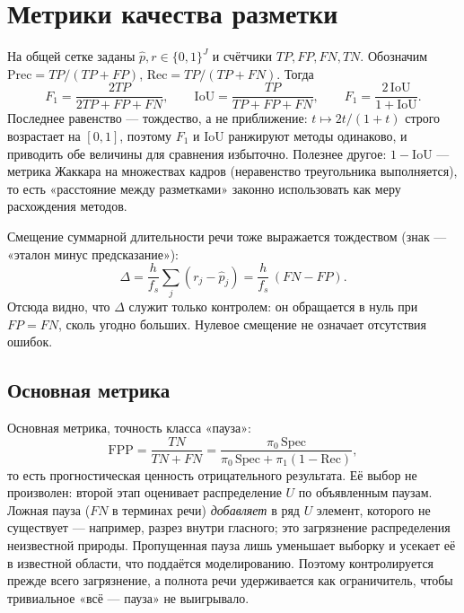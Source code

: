 \documentclass[11pt,a4paper]{article}
\theoremstyle{definition}
\theoremstyle{plain}
\begin{document}
\section{Метрики качества разметки}

На общей сетке заданы $\hat p,r\in\{0,1\}^J$ и счётчики $TP,FP,FN,TN$.
Обозначим $\mathrm{Prec}=TP/(TP+FP)$, $\mathrm{Rec}=TP/(TP+FN)$. Тогда
\begin{equation}\label{eq:metrics}
F_1=\frac{2TP}{2TP+FP+FN},\qquad
\mathrm{IoU}=\frac{TP}{TP+FP+FN},\qquad
F_1=\frac{2\,\mathrm{IoU}}{1+\mathrm{IoU}} .
\end{equation}
Последнее равенство --- тождество, а не приближение: $t\mapsto 2t/(1+t)$
строго возрастает на $[0,1]$, поэтому $F_1$ и $\mathrm{IoU}$ ранжируют методы
одинаково, и приводить обе величины для сравнения избыточно. Полезнее другое:
$1-\mathrm{IoU}$ --- метрика Жаккара на множествах кадров (неравенство
треугольника выполняется), то есть «расстояние между разметками» законно
использовать как меру расхождения методов.

Смещение суммарной длительности речи тоже выражается тождеством
(знак --- «эталон минус предсказание»):
\begin{equation}\label{eq:bias}
\Delta=\frac{h}{f_s}\sum_{j}(r_j-\hat p_j)=\frac{h}{f_s}\,(FN-FP).
\end{equation}
Отсюда видно, что $\Delta$ служит только контролем: он обращается в нуль при
$FP=FN$, сколь угодно больших. Нулевое смещение не означает отсутствия ошибок.

\subsection{Основная метрика}

Основная метрика, точность класса «пауза»:
\begin{equation}\label{eq:fpp}
\mathrm{FPP}=\frac{TN}{TN+FN}
=\frac{\pi_0\,\mathrm{Spec}}{\pi_0\,\mathrm{Spec}+\pi_1(1-\mathrm{Rec})},
\end{equation}
то есть прогностическая ценность отрицательного результата. Её выбор не
произволен: второй этап оценивает распределение $U$ по объявленным паузам.
Ложная пауза ($FN$ в терминах речи) \emph{добавляет} в ряд $U$ элемент,
которого не существует --- например, разрез внутри гласного; это загрязнение
распределения неизвестной природы. Пропущенная пауза лишь уменьшает выборку и
усекает её в известной области, что поддаётся моделированию. Поэтому
контролируется прежде всего загрязнение, а полнота речи удерживается как
ограничитель, чтобы тривиальное «всё --- пауза» не выигрывало.
\end{document}
